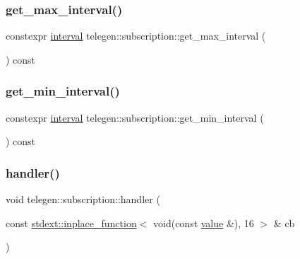 \subsubsection{\texorpdfstring{get\+\_\+max\+\_\+interval()}{get\_max\_interval()}}
{\footnotesize\ttfamily constexpr \hyperlink{namespacetelegen_ad925de2d0a99bc43918533abf0457344}{interval} telegen\+::subscription\+::get\+\_\+max\+\_\+interval (\begin{DoxyParamCaption}{ }\end{DoxyParamCaption}) const\hspace{0.3cm}{\ttfamily [inline]}}

\mbox{\label{classtelegen_1_1subscription_a81200099d915e3e69c0c1dbd940dfc40}} 
\subsubsection{\texorpdfstring{get\+\_\+min\+\_\+interval()}{get\_min\_interval()}}
{\footnotesize\ttfamily constexpr \hyperlink{namespacetelegen_ad925de2d0a99bc43918533abf0457344}{interval} telegen\+::subscription\+::get\+\_\+min\+\_\+interval (\begin{DoxyParamCaption}{ }\end{DoxyParamCaption}) const\hspace{0.3cm}{\ttfamily [inline]}}

\mbox{\label{classtelegen_1_1subscription_acde1f5ed4c26f44c2b9f1929cf1af725}} 
\subsubsection{\texorpdfstring{handler()}{handler()}}
{\footnotesize\ttfamily void telegen\+::subscription\+::handler (\begin{DoxyParamCaption}\item[{const \hyperlink{classstdext_1_1inplace__function}{stdext\+::inplace\+\_\+function}$<$ void(const \hyperlink{classtelegen_1_1value}{value} \&), 16 $>$ \&}]{cb }\end{DoxyParamCaption})\hspace{0.3cm}{\ttfamily [inline]}}

